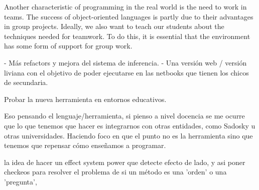 Another characteristic of programming in the real world is the need to work in
teams. The success of object-oriented languages is partly due to their advantages in
group projects. Ideally, we also want to teach our students about the techniques
needed for teamwork. To do this, it is essential that the environment has some form
of support for group work. \cite{kolling_problem_1999}

- Más refactors y mejora del sistema de inferencia.
- Una versión web / versión liviana con el objetivo de poder ejecutarse en las netbooks que tienen los chicos de secundaria.

Probar la nueva herramienta en entornos educativos.

Eso pensando el lenguaje/herramienta, si pienso a nivel docencia se me ocurre que lo que tenemos que hacer es integrarnos con otras entidades, como Sadosky u otras universidades.
Haciendo foco en que el punto no es la herramienta sino que tenemos que repensar cómo enseñamos a programar.

la idea de hacer un effect system
power que detecte efecto de lado, y asi poner checkeos para resolver el problema de si un método es una 'orden' o una 'pregunta', 

